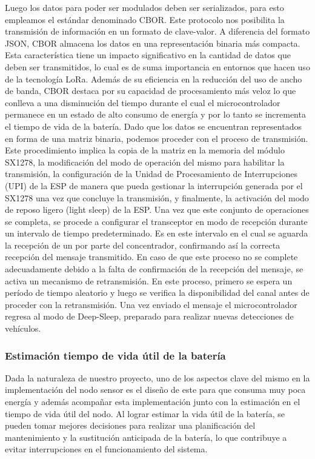 Luego los datos para poder ser modulados deben ser serializados, para esto empleamos el estándar denominado CBOR. Este protocolo nos posibilita la transmisión de información en un formato de clave-valor. A diferencia del formato JSON, CBOR almacena los datos en una representación binaria más compacta. Esta característica tiene un impacto significativo en la cantidad de datos que deben ser transmitidos, lo cual es de suma importancia en entornos que hacen uso de la tecnología LoRa. Además de su eficiencia en la reducción del uso de ancho de banda, CBOR destaca por su capacidad de procesamiento más veloz lo que conlleva a una disminución del tiempo durante el cual el microcontrolador permanece en un estado de alto consumo de energía y por lo tanto se incrementa el tiempo de vida de la batería.
Dado que los datos se encuentran representados en forma de una matriz binaria, podemos proceder con el proceso de transmisión. Este procedimiento implica la copia de la matriz en la memoria del módulo SX1278, la modificación del modo de operación del mismo para habilitar la transmisión, la configuración de la Unidad de Procesamiento de Interrupciones (UPI) de la ESP de manera que pueda gestionar la interrupción generada por el SX1278 una vez que concluye la transmisión, y finalmente, la activación del modo de reposo ligero (light sleep) de la ESP. Una vez que este conjunto de operaciones se completa, se procede a configurar el transceptor en modo de recepción durante un intervalo de tiempo predeterminado. Es en este intervalo en el cual se aguarda la recepción de un  por parte del concentrador, confirmando así la correcta recepción del mensaje transmitido.
En caso de que este proceso no se complete adecuadamente debido a la falta de confirmación de la recepción del mensaje, se activa un mecanismo de retransmisión. En este proceso, primero se espera un período de tiempo aleatorio y luego se verifica la disponibilidad del canal antes de proceder con la retransmisión.
Una vez enviado el mensaje el microcontrolador regresa al modo de Deep-Sleep, preparado para realizar nuevas detecciones de vehículos.




\subsubsection{Estimación tiempo de vida útil de la batería}{\label{sec:bateria_del_nodo_sensor}}
Dada la naturaleza de nuestro proyecto, uno de los aspectos clave del mismo en la
implementación del nodo sensor es el diseño de este para que consuma muy poca energía y
además acompañar esta implementación junto con la estimación en el tiempo de vida útil
del nodo.
Al lograr estimar la vida útil de la batería, se pueden tomar mejores decisiones para
realizar una planificación del mantenimiento y la sustitución anticipada de la batería,
lo que contribuye a evitar interrupciones en el funcionamiento del sistema.

